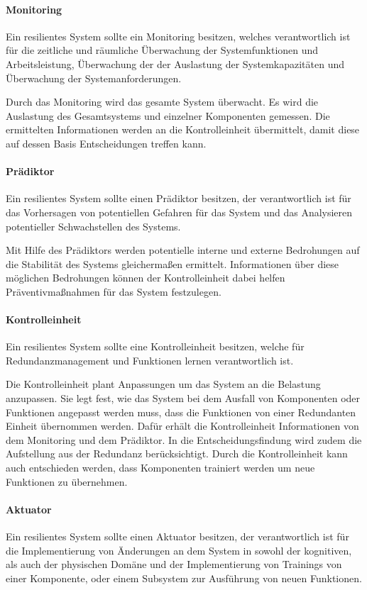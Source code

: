\documentclass[]{lni}
\begin{document}
\paragraph{Monitoring}
Ein resilientes System sollte ein Monitoring besitzen, welches verantwortlich ist für die zeitliche und räumliche Überwachung der Systemfunktionen und Arbeitsleistung, Überwachung der der Auslastung der Systemkapazitäten und Überwachung der Systemanforderungen.

Durch das Monitoring wird das gesamte System überwacht.
Es wird die Auslastung des Gesamtsystems und einzelner Komponenten gemessen.
Die ermittelten Informationen werden an die Kontrolleinheit übermittelt, damit diese auf dessen Basis Entscheidungen treffen kann.

\paragraph{Prädiktor}
Ein resilientes System sollte einen Prädiktor besitzen, der verantwortlich ist für das Vorhersagen von potentiellen Gefahren für das System und das Analysieren potentieller Schwachstellen des Systems.

Mit Hilfe des Prädiktors werden potentielle interne und externe Bedrohungen auf die Stabilität des Systems gleichermaßen ermittelt.
Informationen über diese möglichen Bedrohungen können der Kontrolleinheit dabei helfen Präventivmaßnahmen für das System festzulegen.

\paragraph{Kontrolleinheit}
Ein resilientes System sollte eine Kontrolleinheit besitzen, welche für Redundanzmanagement und Funktionen lernen verantwortlich ist.

Die Kontrolleinheit plant Anpassungen um das System an die Belastung anzupassen.
Sie legt fest, wie das System bei dem Ausfall von Komponenten oder Funktionen angepasst werden muss, dass die Funktionen von einer Redundanten Einheit übernommen werden.
Dafür erhält die Kontrolleinheit Informationen von dem Monitoring und dem Prädiktor.
In die Entscheidungsfindung wird zudem die Aufstellung aus der Redundanz berücksichtigt.
Durch die Kontrolleinheit kann auch entschieden werden, dass Komponenten trainiert werden um neue Funktionen zu übernehmen.

\paragraph{Aktuator}
Ein resilientes System sollte einen Aktuator besitzen, der verantwortlich ist für die Implementierung von Änderungen an dem System in sowohl der kognitiven, als auch der physischen Domäne und der Implementierung von Trainings von einer Komponente, oder einem Subsystem zur Ausführung von neuen Funktionen.
\end{document}
